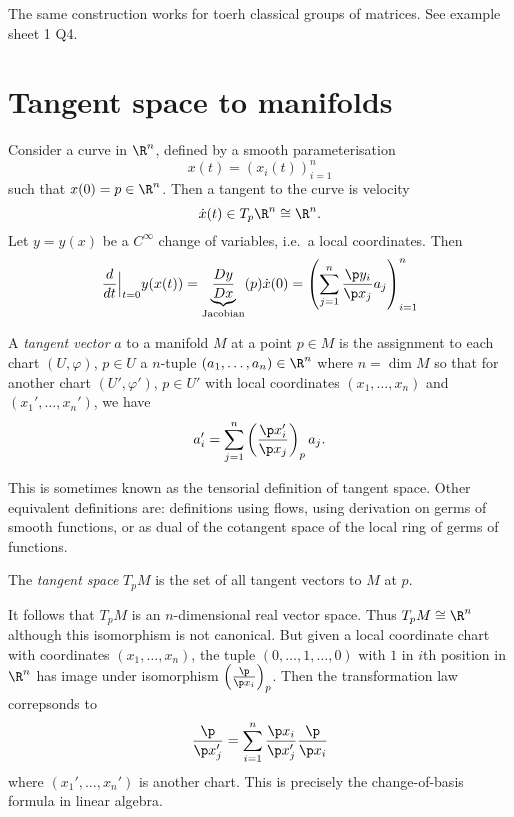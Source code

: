 \documentclass[a4paper]{article}
\begin{document}
The same construction works for toerh classical groups of matrices. See example sheet 1 Q4.

\section{Tangent space to manifolds}

Consider a curve in \(\R^n\), defined by a smooth parameterisation
\[
  x(t) = (x_i(t))_{i = 1}^n
\]
such that \(x(0) = p \in \R^n\). Then a tangent to the curve is velocity
\[
  \dot x(t) \in T_p\R^n \cong \R^n.
\]
Let \(y = y(x)\) be a \(C^\infty\) change of variables, i.e.\ a local coordinates. Then
\[
  \frac{d}{dt} \Big|_{t = 0} y(x(t)) = \underbrace{\frac{D y}{D x}}_{\text{Jacobian}}(p) \dot x(0)
  = \left( \sum_{j = 1}^n \frac{\p y_i}{\p x_j} a_j \right)_{i = 1}^n
\]

\begin{definition}
  A \emph{tangent vector} \(a\) to a manifold \(M\) at a point \(p \in M\) is the assignment to each chart \((U, \varphi)\), \(p \in U\) a \(n\)-tuple \((a_1, \dots, a_n) \in \R^n\) where \(n = \dim M\) so that for another chart \((U', \varphi')\), \(p \in U'\) with local coordinates \((x_1, \dots, x_n)\) and \((x_1', \dots, x_n')\), we have
  \[
    a_i' = \sum_{j = 1}^n \left( \frac{\p x_i'}{\p x_j} \right)_p a_j.
  \]
\end{definition}

This is sometimes known as the tensorial definition of tangent space. Other equivalent definitions are: definitions using flows, using derivation on germs of smooth functions, or as dual of the cotangent space of the local ring of germs of functions.

\begin{definition}
  The \emph{tangent space} \(T_pM\) is the set of all tangent vectors to \(M\) at \(p\).
\end{definition}

It follows that \(T_pM\) is an \(n\)-dimensional real vector space. Thus \(T_pM \cong \R^n\) although this isomorphism is not canonical. But given a local coordinate chart with coordinates \((x_1, \dots, x_n)\), the tuple \((0, \dots, 1, \dots, 0)\) with \(1\) in \(i\)th position in \(\R^n\) has image under isomorphism \(\left( \frac{\p}{\p x_i} \right)_p\). Then the transformation law correpsonds to
\[
  \frac{\p}{\p x_j'} = \sum_{i = 1}^n \frac{\p x_i}{\p x_j'} \frac{\p}{\p x_i}
\]
where \((x_1', \dots, x_n')\) is another chart. This is precisely the change-of-basis formula in linear algebra.

















\printindex
\end{document}
